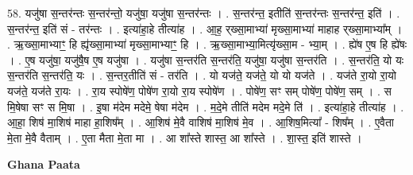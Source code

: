 \documentclass[17pt]{extarticle}
\begin{document}
58. यजु॑षा स॒न्तर॑न्तः स॒न्तर॑न्तो॒ यजु॑षा॒ यजु॑षा स॒न्तर॑न्तः । . स॒न्तर॑न्त॒ इतीति॑ स॒न्तर॑न्तः स॒न्तर॑न्त॒ इति॑ । . स॒न्तर॑न्त॒ इति॑ सं - तर॑न्तः । . इत्या॑हा॒हे तीत्या॑ह । . आ॒ह॒ र्‌ख्सा॒माभ्या॑ मृख्सा॒माभ्या॑ माहाह र्‌ख्सा॒माभ्या᳚म् । . ऋ॒ख्सा॒माभ्याꣳ॒॒ हि ह्यृ॑ख्सा॒माभ्या॑ मृख्सा॒माभ्याꣳ॒॒ हि । . ऋ॒ख्सा॒माभ्या॒मित्यृ॑ख्सा॒म - भ्या॒म् । . ह्ये॑ष ए॒ष हि ह्ये॑षः । . ए॒ष यजु॑षा॒ यजु॑षै॒ष ए॒ष यजु॑षा । . यजु॑षा स॒न्तर॑ति स॒न्तर॑ति॒ यजु॑षा॒ यजु॑षा स॒न्तर॑ति । . स॒न्तर॑ति॒ यो यः स॒न्तर॑ति स॒न्तर॑ति॒ यः । . स॒न्तर॒तीति॑ सं - तर॑ति । . यो यज॑ते॒ यज॑ते॒ यो यो यज॑ते । . यज॑ते रा॒यो रा॒यो यज॑ते॒ यज॑ते रा॒यः । . रा॒य स्पोषे॑ण॒ पोषे॑ण रा॒यो रा॒य स्पोषे॑ण । . पोषे॑ण॒ सꣳ सम् पोषे॑ण॒ पोषे॑ण॒ सम् । . स मि॒षेषा सꣳ स मि॒षा । . इ॒षा म॑देम मदेमे॒ षेषा म॑देम । . म॒दे॒मे तीति॑ मदेम मदे॒मे ति॑ । . इत्या॑हा॒हे तीत्या॑ह । . आ॒हा॒ शिष॑ मा॒शिष॑ माहा हा॒शिष᳚म् । . आ॒शिष॑ मे॒वै वाशिष॑ मा॒शिष॑ मे॒व । . आ॒शिष॒मित्या᳚ - शिष᳚म् । . ए॒वैता मे॒ता मे॒वै वैताम् । . ए॒ता मैता मे॒ता मा । . आ शा᳚स्ते शास्त॒ आ शा᳚स्ते । . शा॒स्त॒ इति॑ शास्ते । \newline

\textbf{Ghana Paata } \newline
\end{document}
